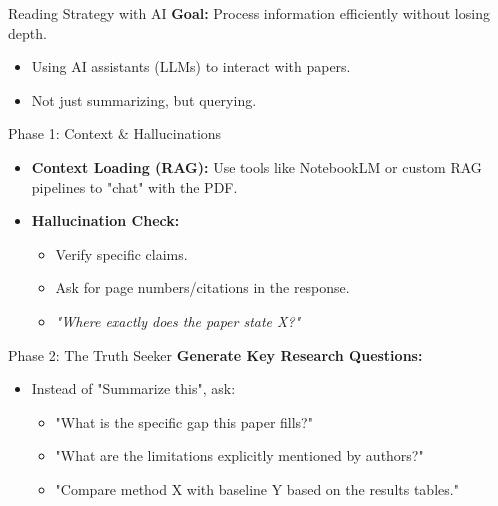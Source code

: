 \documentclass[aspectratio=169]{beamer}
\begin{document}
\begin{frame}[t]{Reading Strategy with AI}
    \textbf{Goal:} Process information efficiently without losing depth.
    \vspace{0.5cm}
    \begin{itemize}
        \item Using AI assistants (LLMs) to interact with papers.
        \item Not just summarizing, but querying.
    \end{itemize}
\end{frame}

\begin{frame}[t]{Phase 1: Context \& Hallucinations}
    \begin{itemize}
        \item \textbf{Context Loading (RAG):} Use tools like NotebookLM or custom RAG pipelines to "chat" with the PDF.
        \item \textbf{Hallucination Check:} 
        \begin{itemize}
            \item Verify specific claims.
            \item Ask for page numbers/citations in the response.
            \item \textit{"Where exactly does the paper state X?"}
        \end{itemize}
    \end{itemize}
\end{frame}

\begin{frame}[t]{Phase 2: The Truth Seeker}
    \textbf{Generate Key Research Questions:}
    \begin{itemize}
        \item Instead of "Summarize this", ask:
        \begin{itemize}
            \item "What is the specific gap this paper fills?"
            \item "What are the limitations explicitly mentioned by authors?"
            \item "Compare method X with baseline Y based on the results tables."
        \end{itemize} 
    \end{itemize}
\end{frame}
\end{document}

